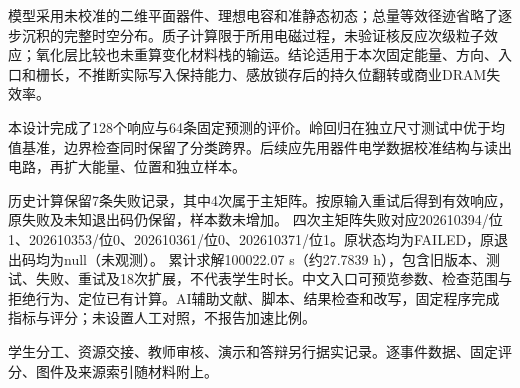 \documentclass[UTF8,a4paper,zihao=-4,fontset=fandol]{ctexart}
\begin{document}
模型采用未校准的二维平面器件、理想电容和准静态初态；总量等效径迹省略了逐步沉积的完整时空分布。质子计算限于所用电磁过程，未验证核反应次级粒子效应；氧化层比较也未重算变化材料栈的输运。结论适用于本次固定能量、方向、入口和栅长，不推断实际写入保持能力、感放锁存后的持久位翻转或商业DRAM失效率\cite{label1996}。

本设计完成了128个响应与64条固定预测的评价。岭回归在独立尺寸测试中优于均值基准，边界检查同时保留了分类跨界。后续应先用器件电学数据校准结构与读出电路，再扩大能量、位置和独立样本。


历史计算保留7条失败记录，其中4次属于主矩阵。按原输入重试后得到有效响应，原失败及未知退出码仍保留，样本数未增加。
四次主矩阵失败对应202610394/位1、202610353/位0、202610361/位0、202610371/位1。原状态均为FAILED，原退出码均为null（未观测）。
累计求解100022.07 s（约27.7839 h），包含旧版本、测试、失败、重试及18次扩展，不代表学生时长。中文入口可预览参数、检查范围与拒绝行为、定位已有计算。AI辅助文献、脚本、结果检查和改写，固定程序完成指标与评分；未设置人工对照，不报告加速比例。

学生分工、资源交接、教师审核、演示和答辩另行据实记录。逐事件数据、固定评分、图件及来源索引随材料附上\cite{project}。

{\footnotesize\linespread{1.02}\selectfont}
\end{document}
